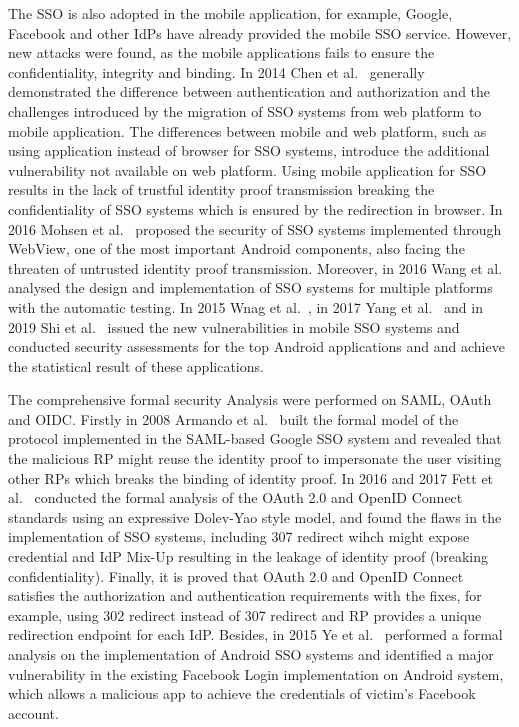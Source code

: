The SSO is also adopted in the mobile application, for example, Google, Facebook and other IdPs have already provided the mobile SSO service. However, new attacks were found, as the mobile applications fails to ensure the confidentiality, integrity and binding. In 2014 Chen et al.~\cite{ChenPCTKT14} generally demonstrated the difference between authentication and authorization and the challenges introduced by the migration of SSO systems from web platform to mobile application. The differences between mobile and web platform, such as using application instead of browser for SSO systems, introduce the additional vulnerability not available on web platform. Using mobile application for SSO results in the lack of trustful identity proof transmission breaking the confidentiality of SSO systems which is ensured by the redirection in browser. In 2016 Mohsen et al.~\cite{MohsenS16} proposed the security of SSO systems implemented through WebView, one of the most important Android components, also facing the threaten of untrusted identity proof transmission.
 Moreover, in 2016 Wang et al.~\cite{WangZLG16} analysed the design and implementation of SSO systems for multiple platforms with the automatic testing. In 2015 Wnag et al.~\cite{WangZLLYLG15}, in 2017 Yang et al.~\cite{YangLS17} and in 2019 Shi et al.~\cite{ShiWL19} issued the new vulnerabilities in mobile SSO systems and conducted security assessments for the top Android applications and and achieve the statistical result of these applications.




The comprehensive formal security Analysis were performed on SAML, OAuth and OIDC. Firstly in 2008 Armando et al.~\cite{ArmandoCCCT08} built the formal model of the protocol implemented in the SAML-based Google SSO system and revealed that the malicious RP might reuse the identity proof to impersonate the user visiting other RPs which breaks the binding of identity proof. In 2016 and 2017 Fett et al.~\cite{FettKS16, FettKS17} conducted the formal analysis of the OAuth 2.0 and OpenID Connect standards using an expressive Dolev-Yao style model, and found the flaws in the implementation of SSO systems, including 307 redirect wihch might expose credential and IdP Mix-Up resulting in the leakage of identity proof (breaking confidentiality). Finally, it is proved that OAuth 2.0 and OpenID Connect satisfies the authorization and authentication requirements with the fixes, for example, using 302 redirect instead of 307 redirect and RP provides a unique redirection endpoint for each IdP. Besides, in 2015 Ye et al.~\cite{YeBWD15} performed a formal analysis on the implementation of Android SSO systems and identified a major vulnerability in the existing Facebook Login implementation on Android system, which allows a malicious app to achieve the credentials of victim’s Facebook account.

